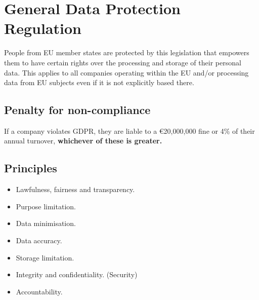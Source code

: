 \documentclass[12pt]{report}
\begin{document}
\pagebreak

\section{General Data Protection Regulation}
People from EU member states are protected by this legislation that empowers them to have certain rights over the processing and storage of their personal data.
This applies to all companies operating within the EU and/or processing data from EU subjects even if it is not explicitly based there.
\subsection{Penalty for non-compliance}
If a company violates GDPR, they are liable to a \euro20,000,000 fine or 4\% of their annual turnover, \textbf{whichever of these is greater.}

\subsection{Principles}
\begin{itemize}
	\item Lawfulness, fairness and transparency.
	\item Purpose limitation.
	\item Data minimisation.
	\item Data accuracy.
	\item Storage limitation.
	\item Integrity and confidentiality. (Security)
	\item Accountability.
\end{itemize}
\end{document}
